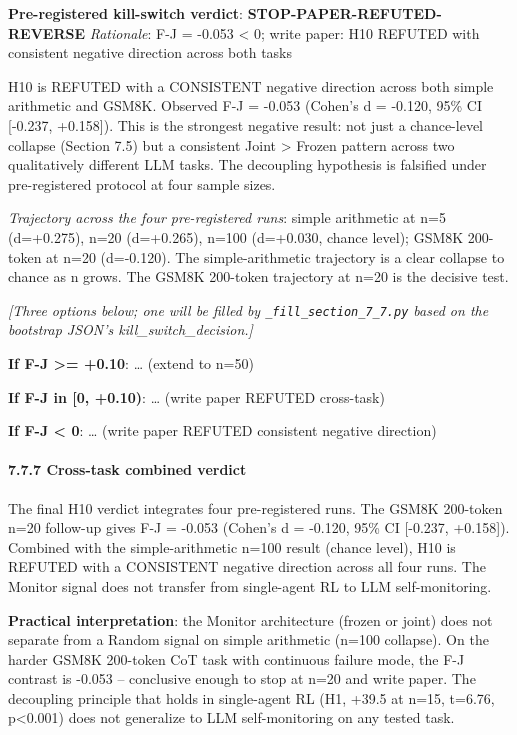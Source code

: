 \documentclass[
]{article}
\begin{document}
\textbf{Pre-registered kill-switch verdict}:
\textbf{STOP-PAPER-REFUTED-REVERSE} \emph{Rationale}: F-J = -0.053
\textless{} 0; write paper: H10 REFUTED with consistent negative
direction across both tasks

H10 is REFUTED with a CONSISTENT negative direction across both simple
arithmetic and GSM8K. Observed F-J = -0.053 (Cohen's d = -0.120, 95\% CI
{[}-0.237, +0.158{]}). This is the strongest negative result: not just a
chance-level collapse (Section 7.5) but a consistent Joint
\textgreater{} Frozen pattern across two qualitatively different LLM
tasks. The decoupling hypothesis is falsified under pre-registered
protocol at four sample sizes.

\emph{Trajectory across the four pre-registered runs}: simple arithmetic
at n=5 (d=+0.275), n=20 (d=+0.265), n=100 (d=+0.030, chance level);
GSM8K 200-token at n=20 (d=-0.120). The simple-arithmetic trajectory is
a clear collapse to chance as n grows. The GSM8K 200-token trajectory at
n=20 is the decisive test.

\emph{{[}Three options below; one will be filled by
\texttt{\_fill\_section\_7\_7.py} based on the bootstrap JSON's
kill\_switch\_decision.{]}}

\textbf{If F-J \textgreater= +0.10}: \ldots{} (extend to n=50)

\textbf{If F-J in {[}0, +0.10)}: \ldots{} (write paper REFUTED
cross-task)

\textbf{If F-J \textless{} 0}: \ldots{} (write paper REFUTED consistent
negative direction)

\paragraph{7.7.7 Cross-task combined
verdict}\label{cross-task-combined-verdict}

The final H10 verdict integrates four pre-registered runs. The GSM8K
200-token n=20 follow-up gives F-J = -0.053 (Cohen's d = -0.120, 95\% CI
{[}-0.237, +0.158{]}). Combined with the simple-arithmetic n=100 result
(chance level), H10 is REFUTED with a CONSISTENT negative direction
across all four runs. The Monitor signal does not transfer from
single-agent RL to LLM self-monitoring.

\textbf{Practical interpretation}: the Monitor architecture (frozen or
joint) does not separate from a Random signal on simple arithmetic
(n=100 collapse). On the harder GSM8K 200-token CoT task with continuous
failure mode, the F-J contrast is -0.053 -- conclusive enough to stop at
n=20 and write paper. The decoupling principle that holds in
single-agent RL (H1, +39.5 at n=15, t=6.76, p\textless0.001) does not
generalize to LLM self-monitoring on any tested task.
\end{document}

